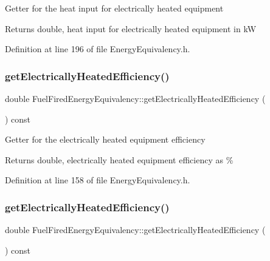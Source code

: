 Getter for the heat input for electrically heated equipment

\begin{DoxyReturn}{Returns}
double, heat input for electrically heated equipment in kW 
\end{DoxyReturn}


Definition at line 196 of file Energy\+Equivalency.\+h.

\mbox{\label{class_fuel_fired_energy_equivalency_ad4bd750677313895d8345c7eaf8308bd}} 
\subsubsection{\texorpdfstring{get\+Electrically\+Heated\+Efficiency()}{getElectricallyHeatedEfficiency()}\hspace{0.1cm}{\footnotesize\ttfamily [1/3]}}
{\footnotesize\ttfamily double Fuel\+Fired\+Energy\+Equivalency\+::get\+Electrically\+Heated\+Efficiency (\begin{DoxyParamCaption}{ }\end{DoxyParamCaption}) const\hspace{0.3cm}{\ttfamily [inline]}}

Getter for the electrically heated equipment efficiency

\begin{DoxyReturn}{Returns}
double, electrically heated equipment efficiency as \% 
\end{DoxyReturn}


Definition at line 158 of file Energy\+Equivalency.\+h.

\mbox{\label{class_fuel_fired_energy_equivalency_ad4bd750677313895d8345c7eaf8308bd}} 
\subsubsection{\texorpdfstring{get\+Electrically\+Heated\+Efficiency()}{getElectricallyHeatedEfficiency()}\hspace{0.1cm}{\footnotesize\ttfamily [2/3]}}
{\footnotesize\ttfamily double Fuel\+Fired\+Energy\+Equivalency\+::get\+Electrically\+Heated\+Efficiency (\begin{DoxyParamCaption}{ }\end{DoxyParamCaption}) const\hspace{0.3cm}{\ttfamily [inline]}}

